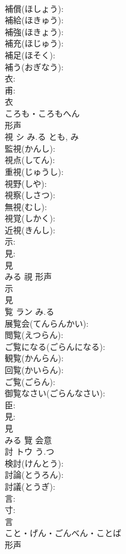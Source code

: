\documentclass[8pt]{extreport}
\begin{document}
\begin{CJK}{UTF8}{min}
\\	補償(ほしょう): 
\\	補給(ほきゅう): 
\\	補強(ほきょう): 
\\	補充(ほじゅう): 
\\	補足(ほそく): 
\\	補う(おぎなう): 
\\	衣: 
\\	甫: 
\\	衣	
\\	ころも・ころもへん	
\\	形声 
\\	視	シ	み.る	とも, み	
\\	監視(かんし): 
\\	視点(してん): 
\\	重視(じゅうし): 
\\	視野(しや): 
\\	視察(しさつ): 
\\	無視(むし): 
\\	視覚(しかく): 
\\	近視(きんし): 
\\	示: 
\\	見: 
\\	見	
\\	みる	視	形声 
\\	示 
\\	見 
\\	覧	ラン	み.る		
\\	展覧会(てんらんかい): 
\\	閲覧(えつらん): 
\\	ご覧になる(ごらんになる): 
\\	観覧(かんらん): 
\\	回覧(かいらん): 
\\	ご覧(ごらん): 
\\	御覧なさい(ごらんなさい): 
\\	臣: 
\\	見: 
\\	見	
\\	みる	覽	会意 
\\	討	トウ	う.つ		
\\	検討(けんとう): 
\\	討論(とうろん): 
\\	討議(とうぎ): 
\\	言: 
\\	寸: 
\\	言	
\\	こと・げん・ごんべん・ことば	
\\	形声 

\end{CJK}
\end{document}
